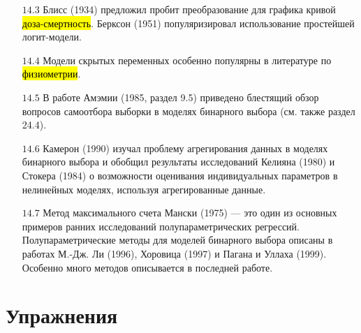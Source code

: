 \begin{enumerate}
\item [$14.3$] Блисс  (1934)  предложил пробит преобразование для графика кривой \hl{доза-смертность}. Берксон  (1951)  популяризировал использование простейшей логит-модели.
\item [$14.4$] Модели скрытых переменных особенно популярны в литературе по \hl{физиометрии}.
\item [$14.5$] В работе Амэмии (1985,  раздел 9.5) приведено блестящий обзор вопросов самоотбора выборки в моделях бинарного выбора (см. также раздел 24.4). 
\item [$14.6$] Камерон  (1990)  изучал проблему агрегирования данных в моделях бинарного выбора и обобщил результаты исследований Келияна  (1980)  и Стокера  (1984)  о возможности оценивания индивидуальных параметров  в нелинейных моделях,   используя агрегированные данные.
\item [$14.7$] Метод максимального счета Мански  (1975)  --- это один из основных примеров ранних исследований полупараметрических регрессий. Полупараметрические методы для моделей бинарного выбора описаны в работах М.-Дж. Ли  (1996),  Хоровица  (1997)  и Пагана и Уллаха  (1999). Особенно много методов описывается в последней работе.
\end{enumerate}

\section*{Упражнения}

